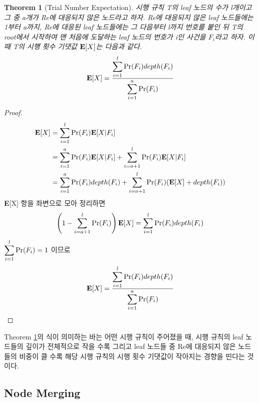 \documentclass[11pt]{article}
\newtheorem{theorem}{Theorem}
\begin{document}
\singlespacing
\begin{theorem}[Trial Number Expectation]
시행 규칙 T의 leaf 노드의 수가 l개이고 그 중 a개가 Re에 대응되지 않은 노드라고 하자. Re에 대응되지 않은 leaf 노드들에는 1부터 a까지, Re에 대응된 leaf 노드들에는 그 다음부터 l까지 번호를 붙인 뒤 T의 root에서 시작하여 맨 처음에 도달하는 leaf 노드의 번호가 i인 사건을 $F_{i}$라고 하자. 이때 T의 시행 횟수 기댓값 $\textnormal{\textbf{E}}[X]$는 다음과 같다.
\[\textnormal{\textbf{E}}[X] = \frac{\displaystyle \sum_{i=1}^{l} \textnormal{Pr}(F_{i})depth(F_{i})}{\displaystyle \sum_{i=1}^{a} \textnormal{Pr}(F_{i})}\]
\label{thm03}
\end{theorem}
\doublespacing

\begin{proof}
\[
\begin{split}
\textbf{E}[X] & = \sum_{i=1}^{l} \textnormal{Pr}(F_{i}) \textbf{E}[X|F_{i}]\\
& = \sum_{i=1}^{a} \textnormal{Pr}(F_{i}) \textbf{E}[X|F_{i}] + \sum_{i=a+1}^{l} \textnormal{Pr}(F_{i}) \textbf{E}[X|F_{i}]\\
& = \sum_{i=1}^{a} \textnormal{Pr}(F_{i})depth(F_{i}) + \sum_{i=a+1}^{l} \textnormal{Pr}(F_{i})(\textbf{E}[X] + depth(F_{i}))\\
\end{split}
\]
\textbf{E}[X] 항을 좌변으로 모아 정리하면
\[\left(1 - \sum_{i=a+1}^{l} \textnormal{Pr}(F_{i})\right)\textbf{E}[X] = \sum_{i=1}^{l} \textnormal{Pr}(F_{i})depth(F_{i})\]
$\displaystyle \sum_{i=1}^{l} \textnormal{Pr}(F_{i}) = 1$ 이므로
\[\textbf{E}[X] = \frac{\displaystyle \sum_{i=1}^{l} \textnormal{Pr}(F_{i})depth(F_{i})}{\displaystyle \sum_{i=1}^{a} \textnormal{Pr}(F_{i})}\]
\end{proof}

Theorem \ref{thm03}의 식이 의미하는 바는 어떤 시행 규칙이 주어졌을 때, 시행 규칙의 leaf 노드들의 깊이가 전체적으로 작을 수록 그리고 leaf 노드들 중 Re에 대응되지 않은 노드들의 비중이 클 수록 해당 시행 규칙의 시행 횟수 기댓값이 작아지는 경향을 띤다는 것이다.

\subsection{Node Merging}





\end{document}

